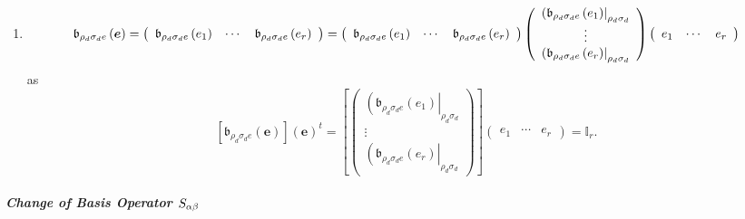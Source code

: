 \documentclass[aps,preprint]{revtex4}
\begin{document}
\begin{enumerate}
\begin{enumerate}
\item 
\begin{equation}
\mathfrak{b}_{\rho _{d}\sigma _{d}e}\left( \boldsymbol{e}\right) =\left( 
\begin{array}{ccc}
\mathfrak{b}_{\rho _{d}\sigma _{d}e}\left( e_{1}\right) & \cdots & \mathfrak{%
b}_{\rho _{d}\sigma _{d}e}\left( e_{r}\right)%
\end{array}%
\right) =\left( 
\begin{array}{ccc}
\mathfrak{b}_{\rho _{d}\sigma _{d}e}\left( e_{1}\right) & \cdots & \mathfrak{%
b}_{\rho _{d}\sigma _{d}e}\left( e_{r}\right)%
\end{array}%
\right) \left( 
\begin{array}{c}
\left( \mathfrak{b}_{\rho _{d}\sigma _{d}e}\left( e_{1}\right) \right\vert
_{\rho _{d}\sigma _{d}} \\ 
\vdots \\ 
\left( \mathfrak{b}_{\rho _{d}\sigma _{d}e}\left( e_{r}\right) \right\vert
_{\rho _{d}\sigma _{d}}%
\end{array}%
\right) \left( 
\begin{array}{ccc}
e_{1} & \cdots & e_{r}%
\end{array}%
\right)
\end{equation}%
as 
\begin{equation}
\left[ \mathfrak{b}_{\rho _{d}\sigma _{d}e}\left( \boldsymbol{e}\right) %
\right] \left( \boldsymbol{e}\right) ^{t}=\left[ \left( 
\begin{array}{c}
\left( \mathfrak{b}_{\rho _{d}\sigma _{d}e}\left( e_{1}\right) \right\vert
_{\rho _{d}\sigma _{d}} \\ 
\vdots \\ 
\left( \mathfrak{b}_{\rho _{d}\sigma _{d}e}\left( e_{r}\right) \right\vert
_{\rho _{d}\sigma _{d}}%
\end{array}%
\right) \right] \left( 
\begin{array}{ccc}
e_{1} & \cdots & e_{r}%
\end{array}%
\right) =\mathbb{I}_{r}.
\end{equation}
\end{enumerate}
\end{enumerate}

\subparagraph{Change of Basis Operator $S_{\protect\alpha \protect\beta }$}
\end{document}
